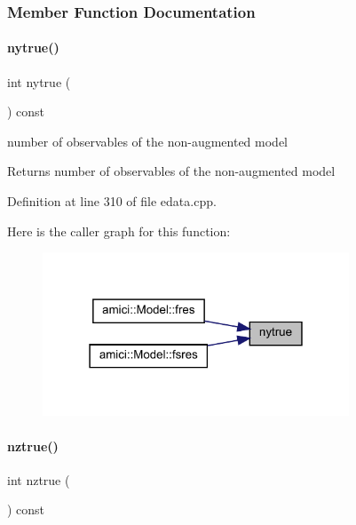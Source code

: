 \subsubsection{Member Function Documentation}
\mbox{\label{classamici_1_1_exp_data_ac2657ffc58ee1ea80d6c4db40010e942}} 
\paragraph{\texorpdfstring{nytrue()}{nytrue()}}
{\footnotesize\ttfamily int nytrue (\begin{DoxyParamCaption}{ }\end{DoxyParamCaption}) const}

number of observables of the non-\/augmented model

\begin{DoxyReturn}{Returns}
number of observables of the non-\/augmented model 
\end{DoxyReturn}


Definition at line 310 of file edata.\+cpp.

Here is the caller graph for this function\+:
\nopagebreak
\begin{figure}[H]
\begin{center}
\leavevmode
\includegraphics[width=259pt]{classamici_1_1_exp_data_ac2657ffc58ee1ea80d6c4db40010e942_icgraph}
\end{center}
\end{figure}
\mbox{\label{classamici_1_1_exp_data_a9e9b6341842d8860b0114faa4e0c97ee}} 
\paragraph{\texorpdfstring{nztrue()}{nztrue()}}
{\footnotesize\ttfamily int nztrue (\begin{DoxyParamCaption}{ }\end{DoxyParamCaption}) const}

